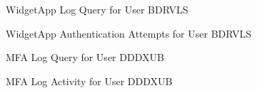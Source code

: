 \documentclass[11pt]{article}
\begin{document}
	\begin{figure}[h]
		\centering
		\caption{WidgetApp Log Query for User BDRVLS}
		\label{fig: A15}
	\end{figure}
	
	\begin{figure}[h]
		\centering
		\caption{WidgetApp Authentication Attempts for User BDRVLS}
		\label{fig: A16}
	\end{figure}
	
	\begin{figure}[h]
		\centering
		\caption{MFA Log Query for User DDDXUB}
		\label{fig: A17}
	\end{figure}
	
	\begin{figure}[h]
		\centering
		\caption{MFA Log Activity for User DDDXUB}
		\label{fig: A18}
	\end{figure}
	
\end{document}
